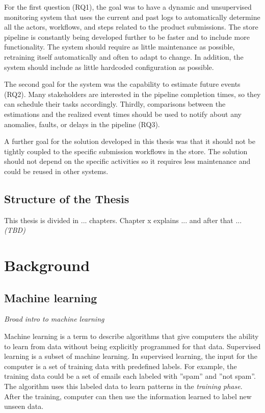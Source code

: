 \documentclass[english,12pt,a4paper,pdftex,sci,utf8]{aaltothesis}
\newcommand{\nyi}[1]{\colorbox{nyibg}{\textcolor{nyitext}{\emph{#1}}}}
\begin{document}
For the first question (RQ1), the goal was to have a dynamic and unsupervised monitoring system 
that uses the current and past logs to automatically determine all the actors, 
workflows, and steps related to the product submissions.
The store pipeline is constantly being developed further to be faster and to include more functionality.
The system should require as little maintenance as possible, retraining itself automatically and often to adapt to change.
In addition, the system should include as little hardcoded configuration as possible.

The second goal for the system was the capability to estimate future events (RQ2). 
Many stakeholders are interested in the pipeline completion times, so they can schedule their tasks accordingly.
Thirdly, comparisons between the estimations and the realized event times should be used to notify 
about any anomalies, faults, or delays in the pipeline (RQ3).

A further goal for the solution developed in this thesis was that it should not be tightly coupled to the 
specific submission workflows in the store. The solution should not depend on the specific activities so
it requires less maintenance and could be reused in other systems.

\subsection{Structure of the Thesis}
This thesis is divided in ... chapters. Chapter x explains ... and after that ... 
\nyi{(TBD)}


\clearpage
\section{Background}
\label{sec:background}

\subsection{Machine learning}

\nyi{Broad intro to machine learning}

Machine learning is a term to describe algorithms that give computers the ability to learn from data without being explicitly programmed for that data. Supervised learning is a subset of machine learning. In supervised learning, the input for the computer is a set of training data with predefined labels. For example, the training data could be a set of emails each labeled with ''spam'' and ''not spam''. The algorithm uses this labeled data to learn patterns in the \emph{training phase}. After the training, computer can then use the information learned to label new unseen data.
\end{document}
